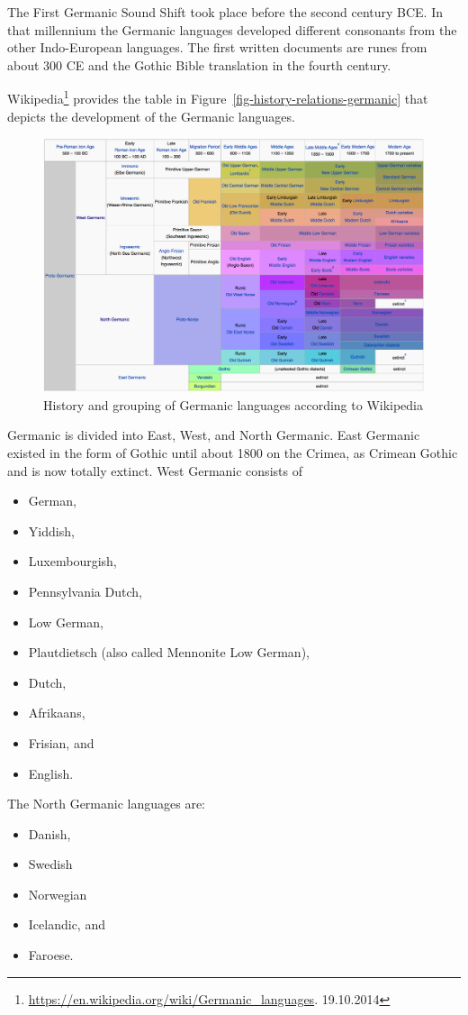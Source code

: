 The First Germanic Sound Shift took place before the second century BCE. In that millennium the
Germanic languages developed different consonants from the other Indo-European languages. The first
written documents are runes from about 300 CE and the Gothic Bible translation in the fourth century.

Wikipedia\footnote{
\url{https://en.wikipedia.org/wiki/Germanic_languages}. 19.10.2014
} provides the table in Figure~\vref{fig-history-relations-germanic} that depicts the development of
the Germanic languages.
\begin{figure}
\begin{sideways}
\includegraphics[width=.9\textheight]{Pictures/germanic-wikipedia}
\end{sideways}
\caption{\label{fig-history-relations-germanic}History and grouping of Germanic languages according to Wikipedia}
\end{figure}
Germanic is divided into East, West, and North Germanic. East Germanic existed in the form of Gothic
until about 1800 on the Crimea, as Crimean Gothic and is now totally extinct. West Germanic consists
of 
\begin{itemize}
\item German, 
\item Yiddish, 
\item Luxembourgish, 
\item Pennsylvania Dutch, 
\item Low German, %
\item Plautdietsch (also called Mennonite Low German), %
\item Dutch, 
\item Afrikaans, 
\item Frisian, and 
\item English.
\end{itemize}
The North Germanic languages are:
\begin{itemize}
\item Danish,
\item Swedish
\item Norwegian
\item Icelandic, and 
\item Faroese.
\end{itemize}


